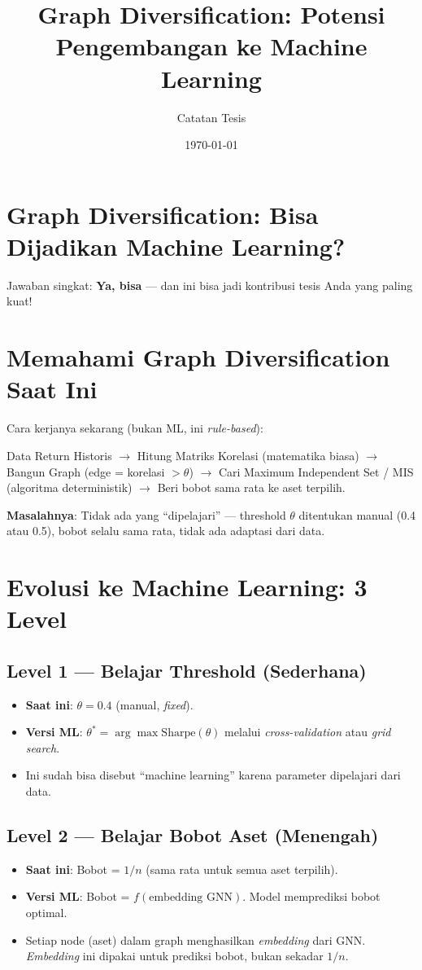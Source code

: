 \documentclass{article}
\title{Graph Diversification: Potensi Pengembangan ke Machine Learning}
\author{Catatan Tesis}
\date{\today}
\begin{document}
\maketitle

\section*{Graph Diversification: Bisa Dijadikan Machine Learning?}
Jawaban singkat: \textbf{Ya, bisa} — dan ini bisa jadi kontribusi tesis Anda yang paling kuat!

\section*{Memahami Graph Diversification Saat Ini}
Cara kerjanya sekarang (bukan ML, ini \textit{rule-based}):

\begin{center}
    Data Return Historis $\rightarrow$ Hitung Matriks Korelasi (matematika biasa) $\rightarrow$ Bangun Graph (edge = korelasi $> \theta$) $\rightarrow$ Cari Maximum Independent Set / MIS (algoritma deterministik) $\rightarrow$ Beri bobot sama rata ke aset terpilih.
\end{center}

\textbf{Masalahnya}: Tidak ada yang ``dipelajari'' — threshold $\theta$ ditentukan manual (0.4 atau 0.5), bobot selalu sama rata, tidak ada adaptasi dari data.

\section*{Evolusi ke Machine Learning: 3 Level}

\subsection*{Level 1 — Belajar Threshold (Sederhana)}
\begin{itemize}
    \item \textbf{Saat ini}: $\theta = 0.4$ (manual, \textit{fixed}).
    \item \textbf{Versi ML}: $\theta^* = \arg\max \text{Sharpe}(\theta)$ melalui \textit{cross-validation} atau \textit{grid search}.
    \item Ini sudah bisa disebut ``machine learning'' karena parameter dipelajari dari data.
\end{itemize}

\subsection*{Level 2 — Belajar Bobot Aset (Menengah)}
\begin{itemize}
    \item \textbf{Saat ini}: Bobot = $1/n$ (sama rata untuk semua aset terpilih).
    \item \textbf{Versi ML}: Bobot = $f(\text{embedding GNN})$. Model memprediksi bobot optimal.
    \item Setiap node (aset) dalam graph menghasilkan \textit{embedding} dari GNN. \textit{Embedding} ini dipakai untuk prediksi bobot, bukan sekadar $1/n$.
\end{itemize}
\end{document}
